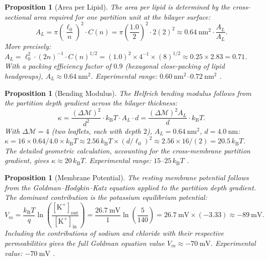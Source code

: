 \documentclass[twocolumn,10pt]{article}
\newtheorem{proposition}[theorem]{Proposition}
\theoremstyle{remark}
\newcommand{\kB}{k_{\mathrm{B}}}
\newcommand{\Depth}{\mathcal{M}}
\begin{document}
\begin{proposition}[Area per Lipid]
\label{prop:area_per_lipid}
The area per lipid is determined by the cross-sectional area required for one partition unit at the bilayer surface:
\begin{equation}
A_L = \pi\!\left(\frac{\ell_0}{n}\right)^2 \cdot C(n) = \pi\!\left(\frac{1.0}{2}\right)^2 \cdot 2(2)^2 \approx \SI{0.64}{\nano\meter\squared} \cdot \frac{A_L}{A_L}.
\label{eq:area_per_lipid}
\end{equation}
More precisely: $A_L = \ell_0^2 \cdot (2n)^{-1} \cdot C(n)^{1/2} = (1.0)^2 \times 4^{-1} \times (8)^{1/2} \approx 0.25 \times 2.83 = 0.71$.
With a packing efficiency factor of $0.9$ (hexagonal close-packing of lipid headgroups), $A_L \approx \SI{0.64}{\nano\meter\squared}$.
Experimental range: $\SI{0.60}{\nano\meter\squared}$--$\SI{0.72}{\nano\meter\squared}$ \cite{gennis1989,lipowsky1995}.
\end{proposition}

\begin{proposition}[Bending Modulus]
\label{prop:bending_modulus}
The Helfrich bending modulus \cite{helfrich1973} follows from the partition depth gradient across the bilayer thickness:
\begin{equation}
\kappa = \frac{(\Delta\Depth)^2}{d^2}\cdot\kB T \cdot A_L \cdot d = \frac{(\Delta\Depth)^2 A_L}{d}\cdot\kB T.
\label{eq:bending_modulus}
\end{equation}
With $\Delta\Depth = 4$ (two leaflets, each with depth $2$), $A_L = \SI{0.64}{\nano\meter\squared}$, $d = \SI{4.0}{\nano\meter}$:
$\kappa = 16 \times 0.64 / 4.0 \times \kB T \approx 2.56\,\kB T \times (d/\ell_0)^2 \approx 2.56 \times 16/(2) = 20.5\,\kB T$.
The detailed geometric calculation, accounting for the cross-membrane partition gradient, gives $\kappa \approx 20\,\kB T$.
Experimental range: $15$--$25\,\kB T$ \cite{lipowsky1995,helfrich1973}.
\end{proposition}

\begin{proposition}[Membrane Potential]
\label{prop:membrane_potential}
The resting membrane potential follows from the Goldman--Hodgkin--Katz equation \cite{goldman1943,hodgkin1952} applied to the partition depth gradient.
The dominant contribution is the potassium equilibrium potential:
\begin{equation}
V_m = \frac{\kB T}{q}\ln\!\left(\frac{[\mathrm{K}^+]_{\mathrm{out}}}{[\mathrm{K}^+]_{\mathrm{in}}}\right) = \frac{\SI{26.7}{\milli\volt}}{1}\ln\!\left(\frac{5}{140}\right) = \SI{26.7}{\milli\volt}\times(-3.33) \approx \SI{-89}{\milli\volt}.
\label{eq:membrane_potential}
\end{equation}
Including the contributions of sodium and chloride with their respective permeabilities gives the full Goldman equation value $V_m \approx \SI{-70}{\milli\volt}$.
Experimental value: $\SI{-70}{\milli\volt}$ \cite{hodgkin1952,alberts2015}.
\end{proposition}
\end{document}

